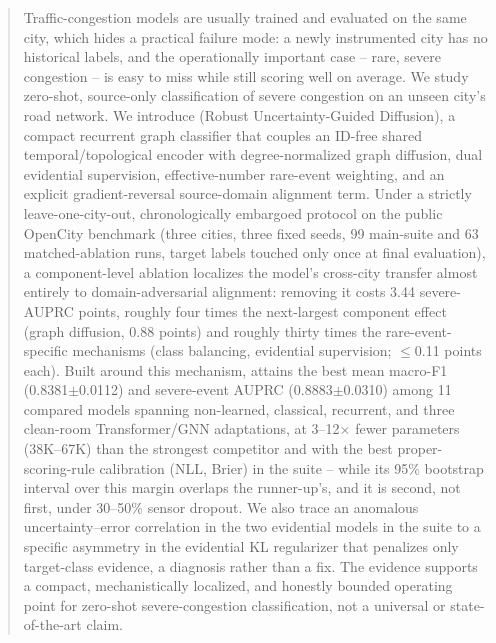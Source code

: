 \begin{abstract}
Traffic-congestion models are usually trained and evaluated on the same city, which hides a
practical failure mode: a newly instrumented city has no historical labels, and the operationally
important case -- rare, severe congestion -- is easy to miss while still scoring well on average.
We study zero-shot, source-only classification of severe congestion on an unseen city's road
network. We introduce \methodname{} (Robust Uncertainty-Guided Diffusion), a compact recurrent
graph classifier that couples an ID-free shared temporal/topological encoder with degree-normalized
graph diffusion, dual evidential supervision, effective-number rare-event weighting, and an
explicit gradient-reversal source-domain alignment term. Under a strictly leave-one-city-out,
chronologically embargoed protocol on the public OpenCity benchmark (three cities, three fixed
seeds, 99 main-suite and 63 matched-ablation runs, target labels touched only once at final
evaluation), a component-level ablation localizes the model's cross-city transfer almost entirely
to domain-adversarial alignment: removing it costs 3.44 severe-AUPRC points, roughly four times
the next-largest component effect (graph diffusion, 0.88 points) and roughly thirty times the
rare-event-specific mechanisms (class balancing, evidential supervision; $\le$0.11 points each).
Built around this mechanism, \methodname{} attains the best mean macro-F1 (0.8381$\pm$0.0112) and
severe-event AUPRC (0.8883$\pm$0.0310) among 11 compared models spanning non-learned, classical,
recurrent, and three clean-room Transformer/GNN adaptations, at 3--12$\times$ fewer parameters
(38K--67K) than the strongest competitor and with the best proper-scoring-rule calibration (NLL,
Brier) in the suite -- while its 95\% bootstrap interval over this margin overlaps the runner-up's,
and it is second, not first, under 30--50\% sensor dropout. We also trace an anomalous
uncertainty--error correlation in the two evidential models in the suite to a specific asymmetry in
the evidential KL regularizer that penalizes only target-class evidence, a diagnosis rather than a
fix. The evidence supports a compact, mechanistically localized, and honestly bounded operating
point for zero-shot severe-congestion classification, not a universal or state-of-the-art claim.
\end{abstract}
